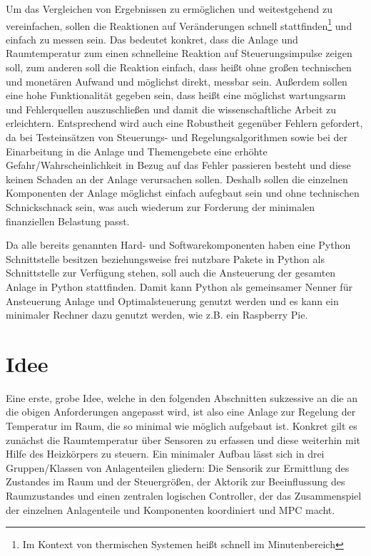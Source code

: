 Um das Vergleichen von Ergebnissen zu ermöglichen und weitestgehend zu vereinfachen, sollen die Reaktionen auf Veränderungen schnell stattfinden\footnote{Im Kontext von thermischen Systemen heißt schnell im Minutenbereich} und einfach zu messen sein. Das bedeutet konkret, dass die Anlage und Raumtemperatur zum einen \Gun schnell\Gob eine Reaktion auf Steuerungsimpulse zeigen soll, zum anderen soll die Reaktion einfach, dass heißt ohne großen technischen und monetären Aufwand und möglichst direkt, messbar sein. 
Außerdem sollen eine hohe Funktionalität gegeben sein, dass heißt eine möglichst wartungsarm und Fehlerquellen auszuschließen und damit die wissenschaftliche Arbeit zu erleichtern. Entsprechend wird auch eine Robustheit gegenüber Fehlern gefordert, da bei Testeinsätzen von Steuerungs- und Regelungsalgorithmen sowie bei der Einarbeitung in die Anlage und Themengebete eine erhöhte Gefahr/Wahrscheinlichkeit in Bezug auf das Fehler passieren besteht und diese keinen Schaden an der Anlage verursachen sollen. Deshalb sollen die einzelnen Komponenten der Anlage möglichst einfach aufegbaut sein und ohne technischen Schnickschnack sein, was auch wiederum zur Forderung der minimalen finanziellen Belastung passt.

Da alle bereits genannten Hard- und Softwarekomponenten haben eine Python Schnittstelle besitzen beziehungsweise frei nutzbare Pakete in Python als Schnittstelle zur Verfügung stehen, soll auch die Ansteuerung der gesamten Anlage in Python stattfinden. Damit kann Python als gemeinsamer Nenner für Ansteuerung Anlage und Optimalsteuerung genutzt werden und es kann ein minimaler Rechner dazu genutzt werden, wie z.B. ein Raspberry Pie.


\section{Idee}
Eine erste, grobe Idee, welche in den folgenden Abschnitten sukzessive an die an die obigen Anforderungen angepasst wird, ist also eine Anlage zur Regelung der Temperatur im Raum, die so minimal wie möglich aufgebaut ist. Konkret gilt es zunächst die Raumtemperatur über Sensoren zu erfassen und diese weiterhin mit Hilfe des Heizkörpers zu steuern. Ein minimaler Aufbau lässt sich in drei Gruppen/Klassen von Anlagenteilen gliedern: Die Sensorik zur Ermittlung des Zustandes im Raum und der Steuergrößen, der Aktorik zur Beeinflussung des Raumzustandes und einen zentralen logischen Controller, der das Zusammenspiel der einzelnen Anlagenteile und Komponenten koordiniert und MPC macht.

